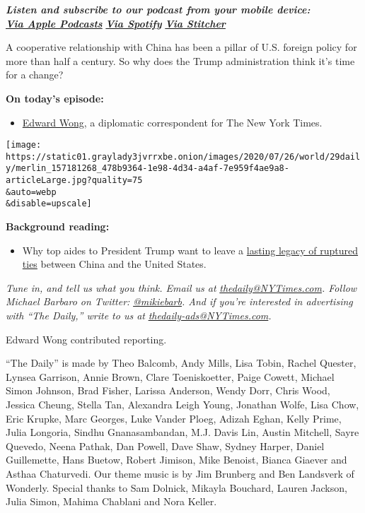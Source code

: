 \emph{\textbf{Listen and subscribe to our podcast from your mobile
device:}}\\
\textbf{\href{https://itunes.apple.com/us/podcast/the-daily/id1200361736?mt=2}{\emph{Via
Apple Podcasts}}} \emph{\textbf{\textbar{}}}
\textbf{\href{https://open.spotify.com/show/3IM0lmZxpFAY7CwMuv9H4g?si=SfuMSC55R1qprFsRZU3_zw}{\emph{Via
Spotify}}} \emph{\textbf{\textbar{}}}
\textbf{\href{http://www.stitcher.com/podcast/the-new-york-times/the-daily-10}{\emph{Via
Stitcher}}}

A cooperative relationship with China has been a pillar of U.S. foreign
policy for more than half a century. So why does the Trump
administration think it's time for a change?

\textbf{On today's episode:}

\begin{itemize}
\tightlist
\item
  \href{https://www.nytimes3xbfgragh.onion/by/edward-wong}{Edward Wong},
  a diplomatic correspondent for The New York Times.
\end{itemize}

\texttt{[image: https://static01.graylady3jvrrxbe.onion/images/2020/07/26/world/29daily/merlin\_157181268\_478b9364-1e98-4d34-a4af-7e959f4ae9a8-articleLarge.jpg?quality=75\\\&auto=webp\\\&disable=upscale]}

\textbf{Background reading:}

\begin{itemize}
\tightlist
\item
  Why top aides to President Trump want to leave a
  \href{https://www.nytimes3xbfgragh.onion/2020/07/25/world/asia/us-china-trump-xi.html}{lasting
  legacy of ruptured ties} between China and the United States.
\end{itemize}

\emph{Tune in, and tell us what you think. Email us at}
\href{mailto:thedaily@NYTimes.com}{\emph{thedaily@NYTimes.com}}\emph{.
Follow Michael Barbaro on Twitter:}
\href{https://twitter.com/mikiebarb}{\emph{@mikiebarb}}\emph{. And if
you're interested in advertising with ``The Daily,'' write to us at}
\href{mailto:thedaily-ads@NYTimes.com}{\emph{thedaily-ads@NYTimes.com}}\emph{.}

Edward Wong contributed reporting.

``The Daily'' is made by Theo Balcomb, Andy Mills, Lisa Tobin, Rachel
Quester, Lynsea Garrison, Annie Brown, Clare Toeniskoetter, Paige
Cowett, Michael Simon Johnson, Brad Fisher, Larissa Anderson, Wendy
Dorr, Chris Wood, Jessica Cheung, Stella Tan, Alexandra Leigh Young,
Jonathan Wolfe, Lisa Chow, Eric Krupke, Marc Georges, Luke Vander Ploeg,
Adizah Eghan, Kelly Prime, Julia Longoria, Sindhu Gnanasambandan, M.J.
Davis Lin, Austin Mitchell, Sayre Quevedo, Neena Pathak, Dan Powell,
Dave Shaw, Sydney Harper, Daniel Guillemette, Hans Buetow, Robert
Jimison, Mike Benoist, Bianca Giaever and Asthaa Chaturvedi. Our theme
music is by Jim Brunberg and Ben Landsverk of Wonderly. Special thanks
to Sam Dolnick, Mikayla Bouchard, Lauren Jackson, Julia Simon, Mahima
Chablani and Nora Keller.

